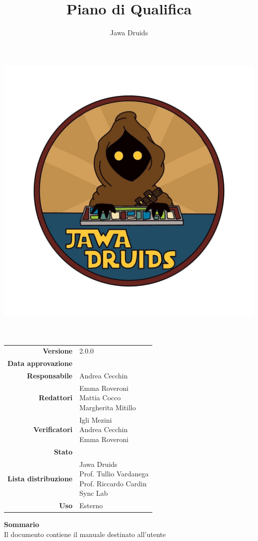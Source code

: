 



	
	\makeatletter
	\begin{titlepage}
		\begin{center}
			\vspace*{-4cm}
			\author{Jawa Druids} 
			\title{Piano di Qualifica}
			\date{} %
			\includegraphics[width=0.5\linewidth]{../immagini/DRUIDSLOGO.jpg}\\[4ex]
			{\huge \bfseries  \@title }\\[2ex] 
			{\LARGE  \@author}\\[50ex]
			\vspace*{-9cm}
			\begin{table}[H]
				\renewcommand{\arraystretch}{1.4}
				\centering
				\begin{tabular}{r | l}
					\textbf{Versione} & 2.0.0 \\%
					\textbf{Data approvazione} & \\
					\textbf{Responsabile} & Andrea Cecchin\\
					\textbf{Redattori} & \makecell[tl]{ Emma Roveroni \\ Mattia Cocco \\ Margherita Mitillo} \\
					\textbf{Verificatori} & \makecell[tl]{Igli Mezini \\ Andrea Cecchin \\ Emma Roveroni} \\
					\textbf{Stato} & \\
					\textbf{Lista distribuzione} & \makecell[tl]{Jawa Druids \\ Prof. Tullio Vardanega \\ Prof. Riccardo Cardin \\ Sync Lab}\\
					\textbf{Uso} & Esterno  
				\end{tabular}
			\end{table}
			\vspace{0.1cm}
			\hfill \break
			\fontsize{17}{10}\textbf{Sommario} \\
			\vspace{0.1cm}
			Il documento contiene il manuale destinato all'utente
		\end{center}
	\end{titlepage}
	\makeatother
	
	
	\tableofcontents{}
	\listoffigures
	\listoftables	
	

